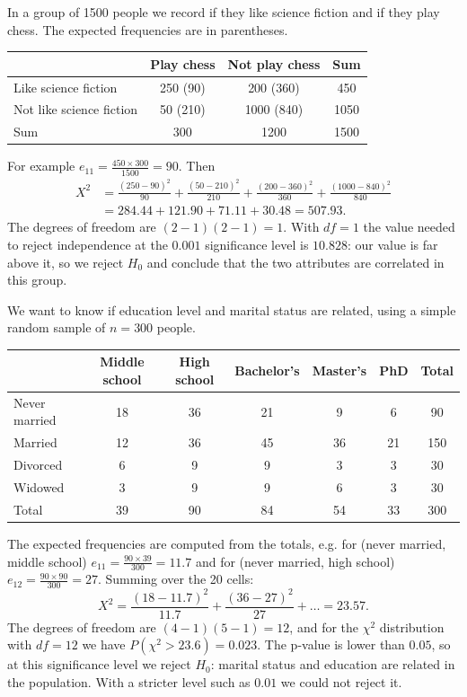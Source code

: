 \begin{example}
    In a group of 1500 people we record if they like science fiction and if they play chess. The expected frequencies are in parentheses.
    \begin{center}
    \begin{tabular}{lccc}
    \toprule
     & Play chess & Not play chess & Sum \\
    \midrule
    Like science fiction & 250 (90) & 200 (360) & 450 \\
    Not like science fiction & 50 (210) & 1000 (840) & 1050 \\
    Sum & 300 & 1200 & 1500 \\
    \bottomrule
    \end{tabular}
    \end{center}
    For example $e_{11}=\frac{450\times 300}{1500}=90$. Then
    \begin{align*}
        X^2&=\frac{(250-90)^2}{90}+\frac{(50-210)^2}{210}+\frac{(200-360)^2}{360}+\frac{(1000-840)^2}{840}\\
        &=284.44+121.90+71.11+30.48=507.93.
    \end{align*}
    The degrees of freedom are $(2-1)(2-1)=1$. With $df=1$ the value needed to reject independence at the $0.001$ significance level is $10.828$: our value is far above it, so we reject $H_0$ and conclude that the two attributes are correlated in this group.
\end{example}

\begin{example}
    We want to know if education level and marital status are related, using a simple random sample of $n=300$ people.
    \begin{center}
    \small
    \begin{tabular}{lcccccc}
    \toprule
     & Middle school & High school & Bachelor's & Master's & PhD & Total \\
    \midrule
    Never married & 18 & 36 & 21 & 9 & 6 & 90 \\
    Married & 12 & 36 & 45 & 36 & 21 & 150 \\
    Divorced & 6 & 9 & 9 & 3 & 3 & 30 \\
    Widowed & 3 & 9 & 9 & 6 & 3 & 30 \\
    Total & 39 & 90 & 84 & 54 & 33 & 300 \\
    \bottomrule
    \end{tabular}
    \end{center}
    The expected frequencies are computed from the totals, e.g. for (never married, middle school) $e_{11}=\frac{90\times 39}{300}=11.7$ and for (never married, high school) $e_{12}=\frac{90\times 90}{300}=27$. Summing over the 20 cells:
    \[
        X^2=\frac{(18-11.7)^2}{11.7}+\frac{(36-27)^2}{27}+\dots=23.57.
    \]
    The degrees of freedom are $(4-1)(5-1)=12$, and for the $\chi^2$ distribution with $df=12$ we have $P(\chi^2>23.6)=0.023$. The p-value is lower than $0.05$, so at this significance level we reject $H_0$: marital status and education are related in the population. With a stricter level such as $0.01$ we could not reject it.
\end{example}

